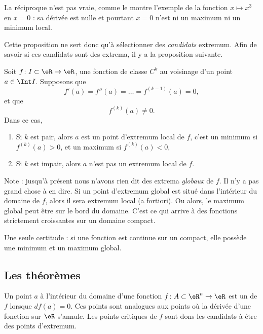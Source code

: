 La réciproque n'est pas vraie, comme le montre l'exemple de la fonction $x\mapsto x^3$ en $x=0$ : sa dérivée est nulle et pourtant $x=0$ n'est ni un maximum ni un minimum local. 

Cette proposition ne sert donc qu'à sélectionner des \emph{candidats} extremum. Afin de savoir si ces candidats sont des extrema, il y a la proposition suivante.
\begin{proposition}
Soit $f\colon I\subset \eR\to \eR$, une fonction de classe $C^k$ au voisinage d'un point $a\in\Int I$. Supposons que
\begin{equation}
    f'(a)=f''(a)=\ldots=f^{(k-1)}(a)=0,
\end{equation}
et que
\begin{equation}
    f^{(k)}(a)\neq 0.
\end{equation}
Dans ce cas,
\begin{enumerate}

\item
Si $k$ est pair, alors $a$ est un point d'extremum local de $f$, c'est un minimum si $f^{(k)}(a)>0$, et un maximum si $f^{(k)}(a)<0$,
\item
Si $k$ est impair, alors $a$ n'est pas un extremum local de $f$.

\end{enumerate}
\end{proposition}

Note : jusqu'à présent nous n'avons rien dit des extrema \emph{globaux} de $f$. Il n'y a pas grand chose à en dire. Si un point d'extremum global est situé dans l'intérieur du domaine de $f$, alors il sera extremum local (a fortiori). Ou alors, le maximum global peut être sur le bord du domaine. C'est ce qui arrive à des fonctions strictement croissantes sur un domaine compact.

Une seule certitude : si une fonction est continue sur un compact, elle possède une minimum et un maximum global.
 
                    \subsection{Les théorèmes}

Un point $a$ à l'intérieur du domaine d'une fonction $f\colon A\subset\eR^n\to \eR$ est un  de $f$ lorsque $df(a)=0$. Ces points sont analogues aux points où la dérivée d'une fonction sur $\eR$ s'annule. Les points critiques de $f$ sont dons les candidats à être des points d'extremum.

